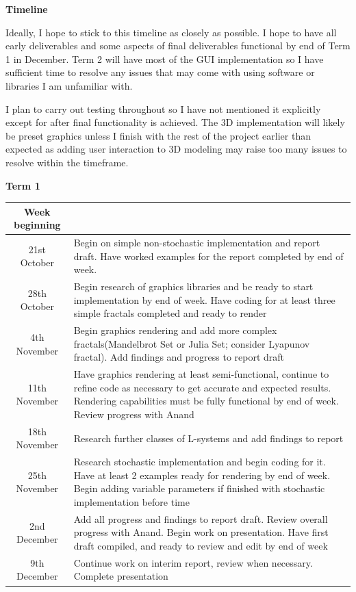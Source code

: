 \documentclass[]{plan}
\begin{document}
{\textsf{\textbf{\LARGE{Timeline}}}}

Ideally, I hope to stick to this timeline as closely as possible. I hope to have all early deliverables and some aspects of final deliverables functional by end of Term 1 in December. Term 2 will have most of the GUI implementation so I have sufficient time to resolve any issues that may come with using software or libraries I am unfamiliar with. 

I plan to carry out testing throughout so I have not mentioned it explicitly except for after final functionality is achieved. The 3D implementation will likely be preset graphics unless I finish with the rest of the project earlier than expected as adding user interaction to 3D modeling may raise too many issues to resolve within the timeframe. 
\newline
\newline

\textbf{\Large{Term 1}}
\renewcommand{\arraystretch}{1.5}
    
\begin{tabular}{c|p{12cm}}
    Week beginning\\
    \hline
    
    21st October & Begin on simple non-stochastic implementation and report draft. Have worked examples for the report completed by end of week.\\
    28th October & Begin research of graphics libraries and be ready to start implementation by end of week. Have coding for at least three simple fractals completed and ready to render\\
    4th November & Begin graphics rendering and add more complex fractals(Mandelbrot Set or Julia Set; consider Lyapunov fractal). Add findings and progress to report draft\\
    11th November & Have graphics rendering at least semi-functional, continue to refine code as necessary to get accurate and expected results. Rendering capabilities must be fully functional by end of week. Review progress with Anand\\
    18th November & Research further classes of L-systems and add findings to report\\
    25th November & Research stochastic implementation and begin coding for it. Have at least 2 examples ready for rendering by end of week. Begin adding variable parameters if finished with stochastic implementation before time\\
    2nd December & Add all progress and findings to report draft. Review overall progress with Anand. Begin work on presentation. Have first draft compiled, and ready to review and edit by end of week\\
    9th December & Continue work on interim report, review when necessary. Complete presentation\\
\end{tabular}
\newpage
\end{document}
